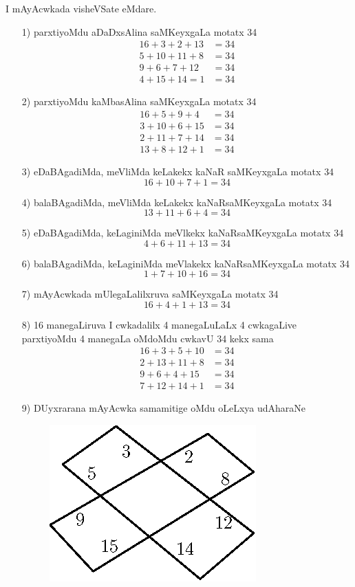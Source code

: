 I mAyAcwkada visheVSate eMdare.
\begin{enumerate}
\item[{\rm 1)}] parxtiyoMdu aDaDxsAlina saMKeyxgaLa motatx {\rm 34}
\begin{align*}
16+3+2+13 &=34\\
5+10+11+8 &=34\\
9+6+7+12 & =34\\
4+15+14=1 &=34
\end{align*}

\item[{\rm 2)}] parxtiyoMdu kaMbasAlina saMKeyxgaLa motatx {\rm 34}
\begin{align*}
16+5+9+4 &=34\\
3+10+6+15 &=34\\
2+11+7+14 & =34\\
13+8+12+1 &=34
\end{align*}

\item[{\rm 3)}] eDaBAgadiMda, meVliMda keLakekx kaNaR saMKeyxgaLa motatx {\rm 34}
$$
16+10+7+1=34
$$

\item[{\rm 4)}] balaBAgadiMda, meVliMda keLakekx kaNaRsaMKeyxgaLa motatx {\rm 34}
$$
13+11+6+4 =34
$$

\item[{\rm 5)}] eDaBAgadiMda, keLaginiMda meVlkekx kaNaRsaMKeyxgaLa motatx {\rm 34}
$$
4+6+11+13=34
$$

\item[{\rm 6)}] balaBAgadiMda, keLaginiMda meVlakekx kaNaRsaMKeyxgaLa motatx {\rm 34}
$$
1+7+10+16=34
$$

\item[{\rm 7)}] mAyAcwkada mUlegaLalilxruva saMKeyxgaLa motatx {\rm 34}
$$
16+4+1+13=34
$$ 

\item[{\rm 8)}] {\rm 16} manegaLiruva I cwkadalilx {\rm 4} manegaLuLaLx {\rm 4} cwkagaLive parxtiyoMdu {\rm 4} manegaLa oMdoMdu cwkavU {\rm 34} kekx sama
\begin{align*}
16+3+5+10 &=34\\
2+13+11+8 &=34\\
9+6+4+15 & =34\\
7+12+14+1 &=34
\end{align*}

\item[{\rm 9)}] DUyxrarana mAyAcwka samamitige oMdu oLeLxya udAharaNe
\begin{figure}[H]
\centering
\includegraphics[scale=.8]{src/figures/m_121.eps}
\end{figure}


\end{enumerate}
